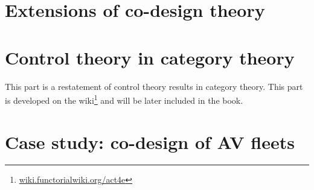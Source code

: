 \chapter{}

\clearpage

\chapter{}

\clearpage


\part{ Extensions of co-design theory}


\chapter{}

 



\part{Control theory in category theory}

This part is a restatement of control theory results in category theory.
This part is developed on the wiki\footnote{\href{https://wiki.functorialwiki.org/act4e/}{wiki.functorialwiki.org/act4e}} and will be later included in the book.



\part{Case study: co-design of AV fleets}

%
%
%
%
\printbibliography